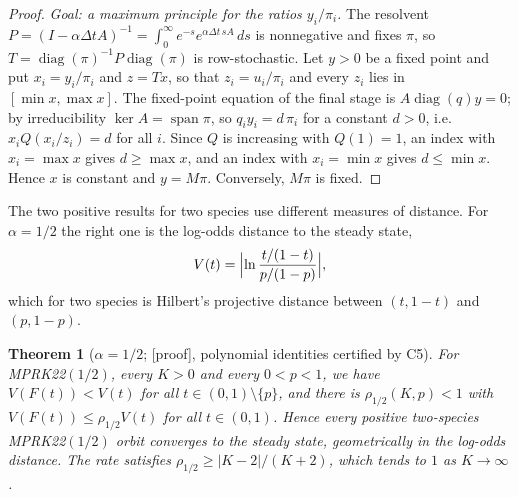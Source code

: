 \documentclass[11pt,a4paper]{article}
\theoremstyle{plain}
\newtheorem{theorem}{Theorem}
\theoremstyle{definition}
\newcommand{\diag}{\operatorname{diag}}
\newcommand{\status}[1]{\textsf{[#1]}}
\begin{document}
\begin{proof}
\emph{Goal: a maximum principle for the ratios $y_i/\pi_i$.} The resolvent $P=(I-\alpha\Delta tA)^{-1}=\int_0^\infty e^{-s}e^{\alpha\Delta t\,sA}\,ds$ is nonnegative and fixes $\pi$, so $T=\diag(\pi)^{-1}P\diag(\pi)$ is row-stochastic. Let $y>0$ be a fixed point and put $x_i=y_i/\pi_i$ and $z=Tx$, so that $z_i=u_i/\pi_i$ and every $z_i$ lies in $[\min x,\max x]$. The fixed-point equation of the final stage is $A\diag(q)y=0$; by irreducibility $\ker A=\operatorname{span}\pi$, so $q_iy_i=d\,\pi_i$ for a constant $d>0$, i.e.\ $x_iQ(x_i/z_i)=d$ for all $i$. Since $Q$ is increasing with $Q(1)=1$, an index with $x_i=\max x$ gives $d\ge\max x$, and an index with $x_i=\min x$ gives $d\le\min x$. Hence $x$ is constant and $y=M\pi$. Conversely, $M\pi$ is fixed.
\end{proof}

The two positive results for two species use different measures of distance. For $\alpha=1/2$ the right one is the log-odds distance to the steady state,
\begin{equation}\label{eq:logodds}
 V(t)=\Bigl|\ln\frac{t/(1-t)}{p/(1-p)}\Bigr|,
\end{equation}
which for two species is Hilbert's projective distance between $(t,1-t)$ and $(p,1-p)$.

\begin{theorem}[$\alpha=1/2$; \status{proof}, polynomial identities certified by C5]\label{thm:half}
For MPRK22$(1/2)$, every $K>0$ and every $0<p<1$, we have $V(F(t))<V(t)$ for all $t\in(0,1)\setminus\{p\}$, and there is $\rho_{1/2}(K,p)<1$ with $V(F(t))\le\rho_{1/2}V(t)$ for all $t\in(0,1)$. Hence every positive two-species MPRK22$(1/2)$ orbit converges to the steady state, geometrically in the log-odds distance. The rate satisfies $\rho_{1/2}\ge|K-2|/(K+2)$, which tends to $1$ as $K\to\infty$.
\end{theorem}
\end{document}
